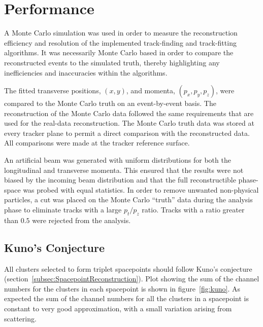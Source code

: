 \section{Performance}
\label{sec:Performance}

  A Monte Carlo simulation was used in order to measure the reconstruction efficiency and resolution of the implemented track-finding and track-fitting algorithms. It was necessarily Monte Carlo based in order to compare the reconstructed events to the simulated truth, thereby highlighting any inefficiencies and inaccuracies within the algorithms.

  The fitted transverse positions, $(x,y)$, and momenta, $(p_x, p_y, p_z)$, were compared to the Monte Carlo truth on an event-by-event basis. The reconstruction of the Monte Carlo data followed the same requirements that are used for the real-data reconstruction. The Monte Carlo truth data was stored at every tracker plane to permit a direct comparison with the reconstructed data. All comparisons were made at the tracker reference surface. %

  An artificial beam was generated with uniform distributions for both the longitudinal and transverse momenta. This ensured that the results were not biased by the incoming beam distribution and that the full reconstructible phase-space was probed with equal statistics. In order to remove unwanted non-physical particles, a cut was placed on the Monte Carlo ``truth'' data during the analysis phase to eliminate tracks with a large $p_t/p_z$ ratio. Tracks with a ratio greater than $0.5$ were rejected from the analysis.
  
  \subsection{Kuno's Conjecture}
  \label{sec:performance:kunos_conjecture}
  All clusters selected to form triplet spacepoints should follow Kuno's conjecture (section~\ref{subsec:SpacepointReconstruction}). Plot showing the sum of the channel numbers for the clusters in each spacepoint is shown in figure~\ref{fig:kuno}. As expected the sum of the channel numbers for all the clusters in a spacepoint is constant to very good approximation, with a small variation arising from scattering.  
  
